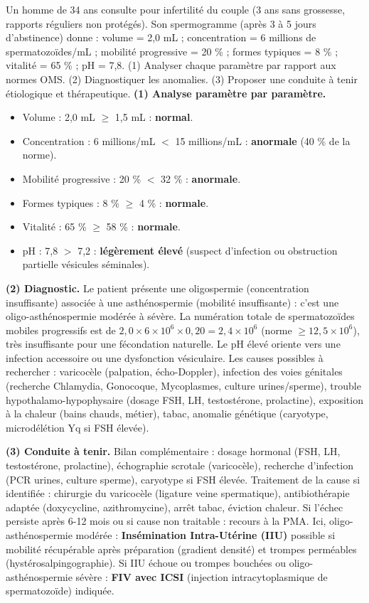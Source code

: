\documentclass[11pt]{article}
\newcommand{\cle}[1]{{\popxbold\color{popdark}#1}}
\begin{document}
\begin{exoresolu}
Un homme de 34 ans consulte pour infertilité du couple (3 ans sans grossesse, rapports réguliers non protégés). Son spermogramme (après 3 à 5 jours d'abstinence) donne : volume = 2,0 mL ; concentration = 6 millions de spermatozoïdes/mL ; mobilité progressive = 20 \% ; formes typiques = 8 \% ; vitalité = 65 \% ; pH = 7,8. (1) Analyser chaque paramètre par rapport aux normes OMS. (2) Diagnostiquer les anomalies. (3) Proposer une conduite à tenir étiologique et thérapeutique.
\tcblower
\textbf{(1) Analyse paramètre par paramètre.}
\begin{itemize}
\item Volume : 2,0 mL $\geq$ 1,5 mL : \textbf{normal}.
\item Concentration : 6 millions/mL $<$ 15 millions/mL : \textbf{anormale} (40 \% de la norme).
\item Mobilité progressive : 20 \% $<$ 32 \% : \textbf{anormale}.
\item Formes typiques : 8 \% $\geq$ 4 \% : \textbf{normale}.
\item Vitalité : 65 \% $\geq$ 58 \% : \textbf{normale}.
\item pH : 7,8 $>$ 7,2 : \textbf{légèrement élevé} (suspect d'infection ou obstruction partielle vésicules séminales).
\end{itemize}

\textbf{(2) Diagnostic.} Le patient présente une \cle{oligospermie} (concentration insuffisante) associée à une \cle{asthénospermie} (mobilité insuffisante) : c'est une \cle{oligo-asthénospermie} modérée à sévère. La numération totale de spermatozoïdes mobiles progressifs est de $2,0 \times 6 \times 10^6 \times 0,20 = 2,4 \times 10^6$ (norme $\geq 12,5 \times 10^6$), très insuffisante pour une fécondation naturelle. Le pH élevé oriente vers une infection accessoire ou une dysfonction vésiculaire. Les causes possibles à rechercher : varicocèle (palpation, écho-Doppler), infection des voies génitales (recherche Chlamydia, Gonocoque, Mycoplasmes, culture urines/sperme), trouble hypothalamo-hypophysaire (dosage FSH, LH, testostérone, prolactine), exposition à la chaleur (bains chauds, métier), tabac, anomalie génétique (caryotype, microdélétion Yq si FSH élevée).

\textbf{(3) Conduite à tenir.} Bilan complémentaire : dosage hormonal (FSH, LH, testostérone, prolactine), échographie scrotale (varicocèle), recherche d'infection (PCR urines, culture sperme), caryotype si FSH élevée. Traitement de la cause si identifiée : chirurgie du varicocèle (ligature veine spermatique), antibiothérapie adaptée (doxycycline, azithromycine), arrêt tabac, éviction chaleur. Si l'échec persiste après 6-12 mois ou si cause non traitable : recours à la \cle{PMA}. Ici, oligo-asthénospermie modérée : \textbf{Insémination Intra-Utérine (IIU)} possible si mobilité récupérable après préparation (gradient densité) et trompes perméables (hystérosalpingographie). Si IIU échoue ou trompes bouchées ou oligo-asthénospermie sévère : \textbf{FIV avec ICSI} (injection intracytoplasmique de spermatozoïde) indiquée.


\end{exoresolu}
\end{document}
